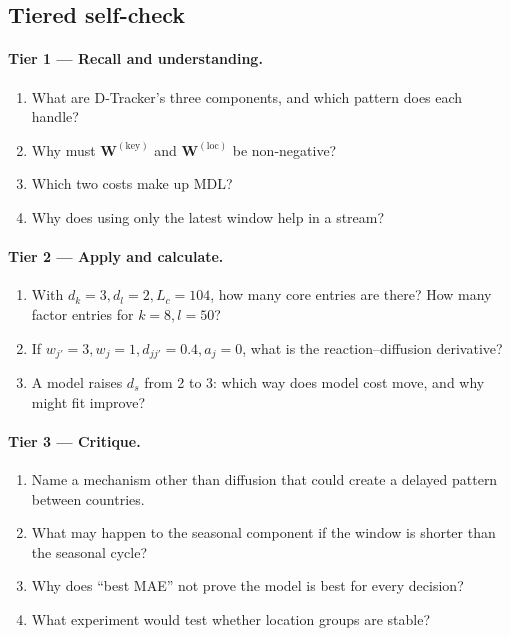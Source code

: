 \subsection*{Tiered self-check}

\paragraph{Tier 1 --- Recall and understanding.}
\begin{enumerate}
  \item What are D-Tracker's three components, and which pattern does each handle?
  \item Why must $\mathbf{W}^{(\mathrm{key})}$ and $\mathbf{W}^{(\mathrm{loc})}$ be non-negative?
  \item Which two costs make up MDL?
  \item Why does using only the latest window help in a stream?
\end{enumerate}

\paragraph{Tier 2 --- Apply and calculate.}
\begin{enumerate}
  \item With $d_k=3,d_l=2,L_c=104$, how many core entries are there? How many factor entries for
        $k=8,l=50$?
  \item If $w_{j'}=3,w_j=1,d_{jj'}=0.4,a_j=0$, what is the reaction--diffusion derivative?
  \item A model raises $d_s$ from 2 to 3: which way does model cost move, and why might fit improve?
\end{enumerate}

\paragraph{Tier 3 --- Critique.}
\begin{enumerate}
  \item Name a mechanism other than diffusion that could create a delayed pattern between countries.
  \item What may happen to the seasonal component if the window is shorter than the seasonal cycle?
  \item Why does ``best MAE'' not prove the model is best for every decision?
  \item What experiment would test whether location groups are stable?
\end{enumerate}

